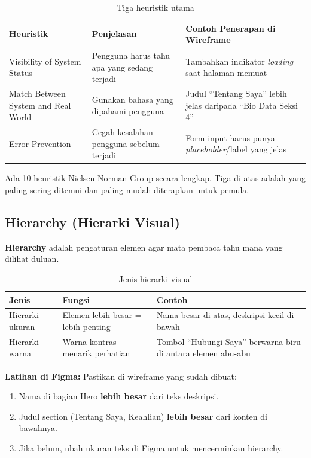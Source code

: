 \begin{table}[ht]
\centering
\caption{Tiga heuristik utama}
\label{tab:m02-heuristik}
\small
\begin{tabular}{lp{4cm}p{5cm}}
\toprule
\textbf{Heuristik} & \textbf{Penjelasan} & \textbf{Contoh Penerapan di Wireframe} \\
\midrule
Visibility of System Status & Pengguna harus tahu apa yang sedang terjadi & Tambahkan indikator \emph{loading} saat halaman memuat \\
Match Between System and Real World & Gunakan bahasa yang dipahami pengguna & Judul ``Tentang Saya'' lebih jelas daripada ``Bio Data Seksi 4'' \\
Error Prevention & Cegah kesalahan pengguna sebelum terjadi & Form input harus punya \emph{placeholder}/label yang jelas \\
\bottomrule
\end{tabular}
\end{table}

\begin{catatan}
Ada 10 heuristik Nielsen Norman Group secara lengkap. Tiga di atas adalah yang paling sering ditemui dan paling mudah diterapkan untuk pemula.
\end{catatan}

\subsection{Hierarchy (Hierarki Visual)}

\textbf{Hierarchy} adalah pengaturan elemen agar mata pembaca tahu mana yang dilihat duluan.

\begin{table}[ht]
\centering
\caption{Jenis hierarki visual}
\label{tab:m02-hierarchy}
\begin{tabular}{llp{5cm}}
\toprule
\textbf{Jenis} & \textbf{Fungsi} & \textbf{Contoh} \\
\midrule
Hierarki ukuran & Elemen lebih besar = lebih penting & Nama besar di atas, deskripsi kecil di bawah \\
Hierarki warna & Warna kontras menarik perhatian & Tombol ``Hubungi Saya'' berwarna biru di antara elemen abu-abu \\
\bottomrule
\end{tabular}
\end{table}

\textbf{Latihan di Figma:} Pastikan di wireframe yang sudah dibuat:
\begin{enumerate}
  \item Nama di bagian Hero \textbf{lebih besar} dari teks deskripsi.
  \item Judul section (Tentang Saya, Keahlian) \textbf{lebih besar} dari konten di bawahnya.
  \item Jika belum, ubah ukuran teks di Figma untuk mencerminkan hierarchy.
\end{enumerate}


